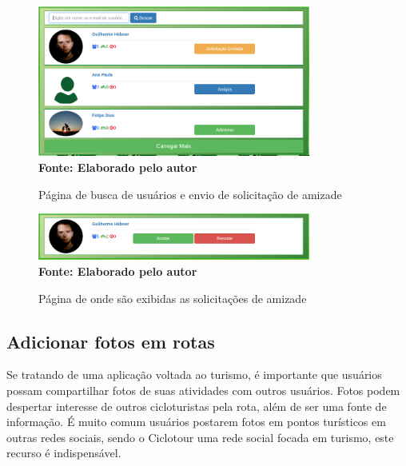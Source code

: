 \begin{figure}[!ht]
	\centering	
	\caption[\hspace{0.1cm} Buscar usuários.]
	{Página de busca de usuários e envio de solicitação de amizade}
	  \vspace{-0.4cm}
	\includegraphics[width=0.8\textwidth]{figuras/buscarUsuario.png}
	 \vspace{0cm}
	\\\textbf{\footnotesize Fonte: Elaborado pelo autor}
	\label{fig:buscarUsuario}
\end{figure}

\begin{figure}[!ht]
	\centering	
	\caption[\hspace{0.1cm} Solicitações de amizade.]
	{Página de onde são exibidas as solicitações de amizade}
	  \vspace{-0.4cm}
	\includegraphics[width=0.8\textwidth]{figuras/solicitacaoAmizade.png}
	 \vspace{0cm}
	\\\textbf{\footnotesize Fonte: Elaborado pelo autor}
	\label{fig:solicitacaoAmizade}
\end{figure}

\subsection{Adicionar fotos em rotas}
Se tratando de uma aplicação voltada ao turismo, é importante que usuários possam compartilhar fotos de suas atividades com outros usuários. Fotos 
podem despertar interesse de outros cicloturistas pela rota, além de ser uma fonte de informação. É muito comum usuários postarem fotos em pontos 
turísticos em outras redes sociais, sendo o Ciclotour uma rede social focada em turismo, este recurso é indispensável.

